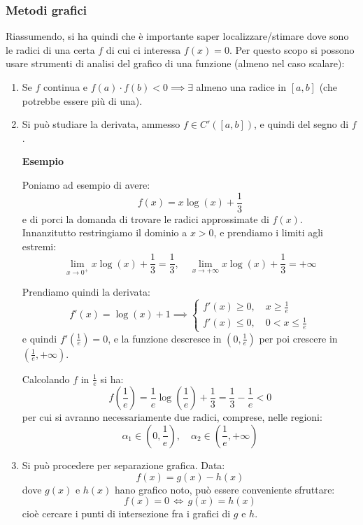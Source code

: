 \documentclass[a4paper,11pt]{article}
\begin{document}
\subsubsection{Metodi grafici}
Riassumendo, si ha quindi che è importante saper localizzare/stimare dove sono le radici di una certa $f$ di cui ci interessa $f(x) = 0$.
Per questo scopo si possono usare strumenti di analisi del grafico di una funzione (almeno nel caso scalare):
\begin{enumerate}
	\item Se $f$ continua e $f(a) \cdot f(b) < 0 \implies \exists$ almeno una radice in $[a ,b]$ (che potrebbe essere più di una).
	\item Si può studiare la derivata, ammesso $f \in C'([a, b])$, e quindi del segno di $f$.

		\noindent
		\textbf{\textsf{Esempio}}

		Poniamo ad esempio di avere:
		$$
		f(x) = x \log(x) + \frac{1}{3}
		$$
		e di porci la domanda di trovare le radici approssimate di $f(x)$.
		Innanzitutto restringiamo il dominio a $x > 0$, e prendiamo i limiti agli estremi:
		$$
		\lim_{x \rightarrow 0^+} x \log(x) + \frac{1}{3} = \frac{1}{3}, \quad
		\lim_{x \rightarrow +\infty} x \log(x) + \frac{1}{3} = +\infty
		$$

		Prendiamo quindi la derivata:
		$$
		f'(x) = \log(x) + 1 \implies
		\begin{cases}
			f'(x) \geq 0, \quad x \geq \frac{1}{e} \\
			f'(x) \leq 0, \quad 0 < x \leq \frac{1}{e}
		\end{cases}
		$$
		e quindi $f'\left( \frac{1}{e} \right) = 0$, e la funzione descresce in $\left(0, \frac{1}{e} \right)$ per poi crescere in $\left( \frac{1}{e}, +\infty \right)$.

		Calcolando $f$ in $\frac{1}{e}$ si ha:
		$$
		f\left( \frac{1}{e} \right) = \frac{1}{e} \log\left( \frac{1}{e} \right) + \frac{1}{3} = \frac{1}{3} - \frac{1}{e} < 0
		$$
		per cui si avranno necessariamente due radici, comprese, nelle regioni:
		$$
		\alpha_1 \in \left(0, \frac{1}{e} \right), \quad \alpha_2 \in \left( \frac{1}{e}, +\infty \right)
		$$

	\item Si può procedere per separazione grafica.
		Data:
		$$
			f(x) = g(x) - h(x)
		$$
		dove $g(x)$ e $h(x)$ hano grafico noto, può essere conveniente sfruttare:
		$$
		f(x) = 0 \, \Leftrightarrow \, g(x) = h(x)
		$$
		cioè cercare i punti di intersezione fra i grafici di $g$ e $h$.
		

\end{enumerate}
\end{document}
